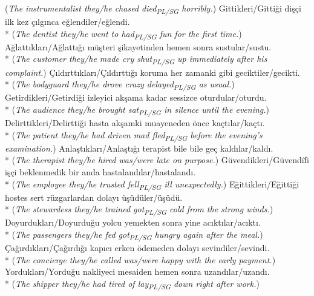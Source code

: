 ({\it The instrumentalist they/he chased died\textsubscript{PL/SG} horribly.})
\ex Gittikleri/Gitti\u{g}i di\c{s}\c{c}i ilk kez \c{c}{\i}lg{\i}nca e\u{g}lendiler/e\u{g}lendi.\\*
({\it The dentist they/he went to had\textsubscript{PL/SG} fun for the first time.})
\ex A\u{g}latt{\i}klar{\i}/A\u{g}latt{\i}\u{g}{\i} m\"{u}\c{s}teri \c{s}ikayetinden hemen sonra sustular/sustu.\\*
({\it The customer they/he made cry shut\textsubscript{PL/SG} up immediately after his complaint.})
\ex \c{C}{\i}ld{\i}rtt{\i}klar{\i}/\c{C}{\i}ld{\i}rtt{\i}\u{g}{\i} koruma her zamanki gibi geciktiler/gecikti.\\*
({\it The bodyguard they/he drove crazy delayed\textsubscript{PL/SG} as usual.})
\ex Getirdikleri/Getirdi\u{g}i izleyici ak\c{s}ama kadar sessizce oturdular/oturdu.\\*
({\it The audience they/he brought sat\textsubscript{PL/SG} in silence until the evening.})
\ex Delirttikleri/Delirtti\u{g}i hasta ak\c{s}amki muayeneden \"{o}nce ka\c{c}t{\i}lar/ka\c{c}t{\i}.\\*
({\it The patient they/he had driven mad fled\textsubscript{PL/SG} before the evening's examination.})
\ex Anla\c{s}t{\i}klar{\i}/Anla\c{s}t{\i}\u{g}{\i} terapist bile bile ge\c{c} kald{\i}lar/kald{\i}.\\*
({\it The therapist they/he hired was/were late on purpose.})
\ex G\"{u}vendikleri/G\"{u}vendi\u{f}i i\c{s}\c{c}i beklenmedik bir anda hastaland{\i}lar/hastaland{\i}.\\*
({\it The employee they/he trusted fell\textsubscript{PL/SG} ill unexpectedly.})
\ex E\u{g}ittikleri/E\u{g}itti\u{g}i hostes sert r\"{u}zgarlardan dolay{\i} \"{u}\c{s}\"{u}d\"{u}ler/\"{u}\c{s}\"{u}d\"{u}.\\*
({\it The stewardess they/he trained got\textsubscript{PL/SG} cold from the strong winds.})
\ex Doyurduklar{\i}/Doyurdu\u{g}u yolcu yemekten sonra yine ac{\i}kt{\i}lar/ac{\i}kt{\i}.\\*
({\it The passengers they/he fed got\textsubscript{PL/SG} hungry again after the meal.})
\ex \c{C}a\u{g}{\i}rd{\i}klar{\i}/\c{C}a\u{g}{\i}rd{\i}\u{g}{\i} kap{\i}c{\i} erken \"{o}demeden dolay{\i} sevindiler/sevindi.\\*
({\it The concierge they/he called was/were happy with the early payment.})
\ex Yorduklar{\i}/Yordu\u{g}u nakliyeci mesaiden hemen sonra uzand{\i}lar/uzand{\i}.\\*
({\it The shipper they/he had tired of lay\textsubscript{PL/SG} down right after work.})
